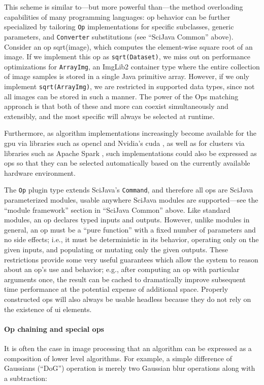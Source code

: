 \documentclass{bmcart}
\begin{document}
This scheme is similar to---but more powerful than---the method
overloading capabilities of many programming languages: op behavior can be
further specialized by tailoring \texttt{Op} implementations for specific
subclasses, generic parameters, and \texttt{Converter} substitutions (see
``SciJava Common'' above). Consider an op sqrt(image), which computes the
element-wise square root of an image. If we implement this op as
\texttt{sqrt(Dataset)}, we miss out on performance optimizations for
\texttt{ArrayImg}, an ImgLib2 container type where the entire collection of
image samples is stored in a single Java primitive array. However, if we only
implement \texttt{sqrt(ArrayImg)}, we are restricted in supported data types,
since not all images can be stored in such a manner. The power of the Ops
matching approach is that both of these and more can coexist simultaneously and
extensibly, and the most specific will always be selected at runtime.

Furthermore, as algorithm implementations increasingly become available for the
\acrshort{gpu} via libraries such as \acrfull{opencl} \cite{opencl} and
Nvidia's \acrfull{cuda} \cite{cuda}, as well as for clusters via libraries such
as Apache Spark \cite{apache_spark}, such implementations could also be
expressed as ops so that they can be selected automatically based on the
currently available hardware environment.

The \texttt{Op} plugin type extends SciJava's \texttt{Command}, and therefore
all ops are SciJava parameterized modules, usable anywhere SciJava modules are
supported---see the ``module framework'' section in ``SciJava Common'' above.
Like standard modules, an op declares typed inputs and outputs. However, unlike
modules in general, an op must be a ``pure function'' with a fixed number of
parameters and no side effects; i.e., it must be deterministic in its behavior,
operating only on the given inputs, and populating or mutating only the given
outputs. These restrictions provide some very useful guarantees which allow the
system to reason about an op's use and behavior; e.g., after computing an op
with particular arguments once, the result can be cached to dramatically
improve subsequent time performance at the potential expense of additional
space. Properly constructed ops will also always be usable headless because
they do not rely on the existence of \acrshort{ui} elements.

\paragraph*{Op chaining and special ops}
It is often the case in image processing that an algorithm can be expressed as
a composition of lower level algorithms. For example, a simple difference of
Gaussians (``DoG'') operation is merely two Gaussian blur operations along with
a subtraction:
\end{document}
